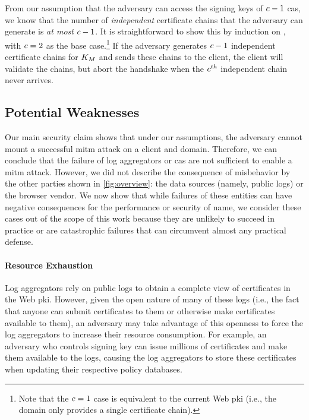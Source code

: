 
From our assumption that the adversary can access the signing keys
of $c - 1$ \acp{ca},
we know that the number of \emph{independent} certificate chains that the adversary can generate
is \emph{at most} $c - 1$. It is straightforward to show this by induction
on \policy, with $c = 2$ as the base case.\footnote{Note that the $c
= 1$ case is equivalent to the current Web \ac{pki} (i.e., the domain only
provides a single certificate chain).} If the adversary generates $c - 1$
independent certificate chains for $K_M$ and sends these chains to
the client, the client will validate the chains, but abort the handshake when
the $c^{th}$ independent chain never arrives.

\subsection{Potential Weaknesses}
\label{sec:analysis:weaknesses}

Our main security claim shows that under our assumptions, the adversary cannot
mount a successful \ac{mitm} attack on a client and domain. Therefore, we can
conclude that the failure of log aggregators or \acp{ca} are not sufficient to
enable a \ac{mitm} attack. However, we did not describe the consequence of
misbehavior by the other parties shown in \autoref{fig:overview}: the data
sources (namely, public logs) or the browser vendor. We now show that while
failures of these entities can have negative consequences for the performance or
security of \ac{name}, we consider these cases out of the scope of this work
because they are unlikely to succeed in practice or are catastrophic failures
that can circumvent almost any practical defense.

\paragraph{Resource Exhaustion}
Log aggregators rely on public logs to obtain a complete view of certificates in
the Web \ac{pki}. However, given the open nature of many of these logs (i.e.,
the fact that anyone can submit certificates to them or otherwise make
certificates available to them), an adversary may take advantage of this
openness to force the log aggregators to increase their resource consumption.
For example, an adversary who controls  signing key can issue millions
of certificates and make them available to the logs, causing the log aggregators
to store these certificates when updating their respective policy databases.

